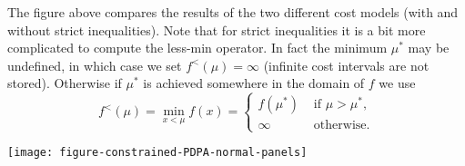 \documentclass{article}
\begin{document}
The figure above compares the results of the two different cost models
(with and without strict inequalities). Note that for strict
inequalities it is a bit more complicated to compute the less-min
operator. In fact the minimum $\mu^*$ may be undefined, in which case
we set $f^{<}(\mu)=\infty$ (infinite cost intervals are not
stored). Otherwise if $\mu^*$ is achieved somewhere in the domain of
$f$ we use
\begin{equation*}
  f^{<}(\mu) = \min_{x<\mu}f(x) = 
  \begin{cases}
    f(\mu^*) & \text{ if } \mu > \mu^*,\\
    \infty & \text{ otherwise.}
  \end{cases}
\end{equation*}


\texttt{[image: figure-constrained-PDPA-normal-panels]}



\end{document}
